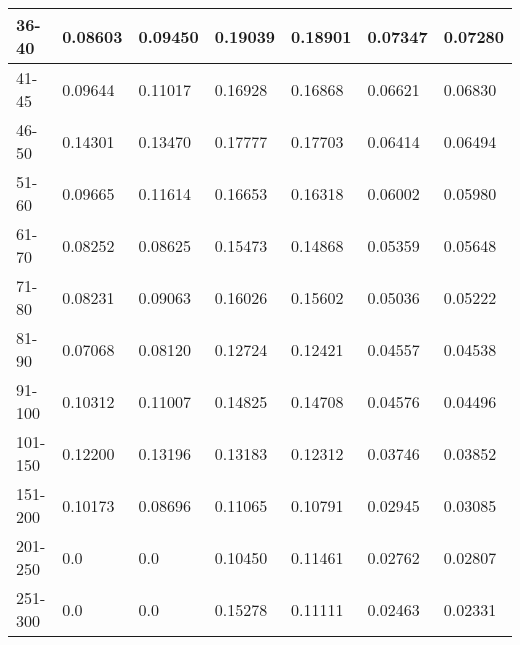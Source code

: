 \begin{table*}[h!]
\begin{tabular}{|l|l|l||l|l||l|l|}
        36-40     & 0.08603                                 & 0.09450                        & 0.19039                          & 0.18901          & 0.07347       & 0.07280          \\ \hline
        41-45     & 0.09644                                 & 0.11017                        & 0.16928                          & 0.16868          & 0.06621       & 0.06830          \\ \hline
        46-50     & 0.14301                                 & 0.13470                        & 0.17777                          & 0.17703          & 0.06414       & 0.06494          \\ \hline
        51-60     & 0.09665                                 & 0.11614                        & 0.16653                          & 0.16318          & 0.06002       & 0.05980          \\ \hline
        61-70     & 0.08252                                 & 0.08625                        & 0.15473                          & 0.14868          & 0.05359       & 0.05648          \\ \hline
        71-80     & 0.08231                                 & 0.09063                        & 0.16026                          & 0.15602          & 0.05036       & 0.05222          \\ \hline
        81-90     & 0.07068                                 & 0.08120                        & 0.12724                          & 0.12421          & 0.04557       & 0.04538          \\ \hline
        91-100    & 0.10312                                 & 0.11007                        & 0.14825                          & 0.14708          & 0.04576       & 0.04496          \\ \hline
        101-150   & 0.12200                                 & 0.13196                        & 0.13183                          & 0.12312          & 0.03746       & 0.03852          \\ \hline
        151-200   & 0.10173                                 & 0.08696                        & 0.11065                          & 0.10791          & 0.02945       & 0.03085          \\ \hline
        201-250   & 0.0                                     & 0.0                            & 0.10450                          & 0.11461          & 0.02762       & 0.02807          \\ \hline
        251-300   & 0.0                                     & 0.0                            & 0.15278                          & 0.11111          & 0.02463       & 0.02331          \\ \hline

\end{tabular}
\end{table*}
